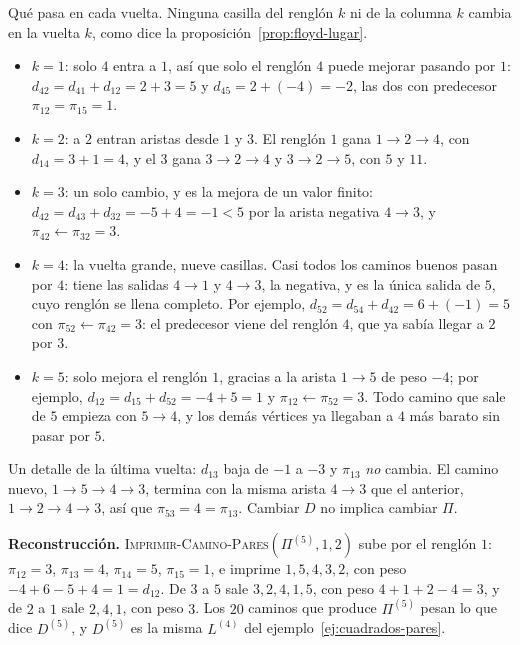 \documentclass[11pt,letterpaper]{article}
\begin{document}
Qué pasa en cada vuelta. Ninguna casilla del renglón $k$ ni de la
columna $k$ cambia en la vuelta $k$, como dice la
proposición~\ref{prop:floyd-lugar}.
\begin{itemize}[itemsep=0.1em]
  \item $k = 1$: solo $4$ entra a $1$, así que solo el renglón $4$
        puede mejorar pasando por $1$: $d_{42} = d_{41} + d_{12} =
        2 + 3 = 5$ y $d_{45} = 2 + (-4) = -2$, las dos con predecesor
        $\pi_{12} = \pi_{15} = 1$.
  \item $k = 2$: a $2$ entran aristas desde $1$ y $3$. El renglón $1$
        gana $1 \to 2 \to 4$, con $d_{14} = 3 + 1 = 4$, y el $3$ gana
        $3 \to 2 \to 4$ y $3 \to 2 \to 5$, con $5$ y $11$.
  \item $k = 3$: un solo cambio, y es la mejora de un valor finito:
        $d_{42} = d_{43} + d_{32} = -5 + 4 = -1 < 5$ por la arista
        negativa $4 \to 3$, y $\pi_{42} \gets \pi_{32} = 3$.
  \item $k = 4$: la vuelta grande, nueve casillas. Casi todos los
        caminos buenos pasan por $4$: tiene las salidas $4 \to 1$ y
        $4 \to 3$, la negativa, y es la única salida de $5$, cuyo
        renglón se llena completo. Por ejemplo,
        $d_{52} = d_{54} + d_{42} = 6 + (-1) = 5$ con
        $\pi_{52} \gets \pi_{42} = 3$: el predecesor viene del renglón
        $4$, que ya sabía llegar a $2$ por $3$.
  \item $k = 5$: solo mejora el renglón $1$, gracias a la arista
        $1 \to 5$ de peso $-4$; por ejemplo,
        $d_{12} = d_{15} + d_{52} = -4 + 5 = 1$ y
        $\pi_{12} \gets \pi_{52} = 3$. Todo camino que sale de $5$
        empieza con $5 \to 4$, y los demás vértices ya llegaban a $4$
        más barato sin pasar por $5$.
\end{itemize}
Un detalle de la última vuelta: $d_{13}$ baja de $-1$ a $-3$ y
$\pi_{13}$ \emph{no} cambia. El camino nuevo,
$1 \to 5 \to 4 \to 3$, termina con la misma arista $4 \to 3$ que el
anterior, $1 \to 2 \to 4 \to 3$, así que $\pi_{53} = 4 = \pi_{13}$.
Cambiar $D$ no implica cambiar $\Pi$.

\textbf{Reconstrucción.} \textsc{Imprimir-Camino-Pares}$(\Pi^{(5)},
1, 2)$ sube por el renglón $1$: $\pi_{12} = 3$, $\pi_{13} = 4$,
$\pi_{14} = 5$, $\pi_{15} = 1$, e imprime $1, 5, 4, 3, 2$, con peso
$-4 + 6 - 5 + 4 = 1 = d_{12}$. De $3$ a $5$ sale $3, 2, 4, 1, 5$, con
peso $4 + 1 + 2 - 4 = 3$, y de $2$ a $1$ sale $2, 4, 1$, con peso $3$.
Los $20$ caminos que produce $\Pi^{(5)}$ pesan lo que dice $D^{(5)}$,
y $D^{(5)}$ es la misma $L^{(4)}$ del
ejemplo~\ref{ej:cuadrados-pares}.
\end{document}
